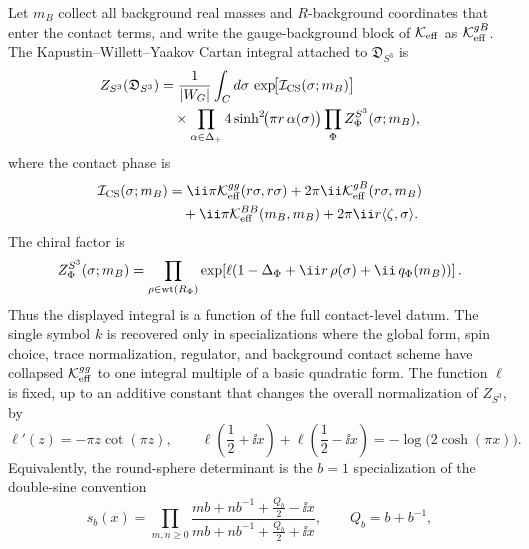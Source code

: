 Let \(m_B\) collect all background real masses and \(R\)-background coordinates
that enter the contact terms, and write the gauge-background block of
\(\mathcal K_{\rm eff}\) as \(\mathcal K_{\rm eff}^{gB}\).  The
Kapustin--Willett--Yaakov Cartan integral attached to
\(\mathfrak D_{S^3}\) is
\begin{equation}
\begin{aligned}
  Z_{S^3}(\mathfrak D_{S^3})
  &=
  \frac1{|W_G|}
  \int_C d\sigma\,
  \exp\!\bigl[\mathcal I_{\rm CS}(\sigma;m_B)\bigr]\\
  &\quad\times
  \prod_{\alpha\in\Delta_+}
  4\sinh^2\!\bigl(\pi r\,\alpha(\sigma)\bigr)
  \prod_{\Phi}Z_{\Phi}^{S^3}(\sigma;m_B),
\end{aligned}
  \label{eq:kwy-s3-localization}
\end{equation}
where the contact phase is
\begin{equation}
  \begin{aligned}
  \mathcal I_{\rm CS}(\sigma;m_B)
  &=
  \ii\pi\mathcal K_{\rm eff}^{gg}(r\sigma,r\sigma)
  +2\pi\ii\mathcal K_{\rm eff}^{gB}(r\sigma,m_B)\\
  &\quad
  +\ii\pi\mathcal K_{\rm eff}^{BB}(m_B,m_B)
  +2\pi\ii r\langle\zeta,\sigma\rangle .
  \end{aligned}
  \label{eq:s3-localization-contact-phase}
\end{equation}
The chiral factor is
\[
  Z_{\Phi}^{S^3}(\sigma;m_B)
  =
  \prod_{\rho\in{\rm wt}(R_\Phi)}
  \exp\!\left[
    \ell\!\left(
      1-\Delta_\Phi
      +\ii r\,\rho(\sigma)
      +\ii\,q_\Phi(m_B)
    \right)
  \right].
\]
Thus the displayed integral is a function of the full contact-level datum.  The
single symbol \(k\) is recovered only in specializations where the global form,
spin choice, trace normalization, regulator, and background contact scheme have
collapsed \(\mathcal K_{\rm eff}^{gg}\) to one integral multiple of a basic
quadratic form.
The function \(\ell\) is fixed, up to an additive constant that changes the
overall normalization of \(Z_{S^3}\), by
\begin{equation}
  \ell'(z)=-\pi z\cot(\pi z),
  \qquad
  \ell\!\left(\frac12+\ii x\right)
  +
  \ell\!\left(\frac12-\ii x\right)
  =
  -\log\!\bigl(2\cosh(\pi x)\bigr).
  \label{eq:kwy-ell-identity}
\end{equation}
Equivalently, the round-sphere determinant is the \(b=1\) specialization of
the double-sine convention
\begin{equation}
  s_b(x)
  =
  \prod_{m,n\ge0}
  \frac{mb+nb^{-1}+\frac{Q_b}{2}-\ii x}
       {mb+nb^{-1}+\frac{Q_b}{2}+\ii x},
  \qquad Q_b=b+b^{-1},
  \label{eq:double-sine-definition}
\end{equation}
